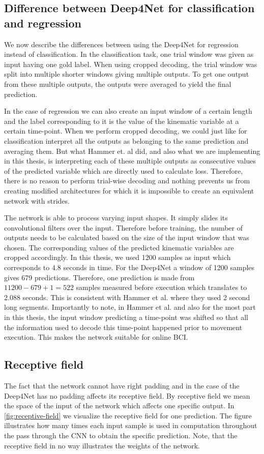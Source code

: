 \subsection{Difference between Deep4Net for classification and regression}\label{subsec:difference-between-deep4net-for-classification-and-regression}
We now describe the differences between using the Deep4Net for regression instead of classification.
In the classification task, one trial window was given as input having one gold label.
When using cropped decoding, the trial window was split into multiple shorter windows giving multiple outputs.
To get one output from these multiple outputs, the outputs were averaged to yield the final prediction.

In the case of regression we can also create an input window of a certain length and the label corresponding to it is the value of the kinematic variable at a certain time-point.
When we perform cropped decoding, we could just like for classification interpret all the outputs as belonging to the same prediction and averaging them.
But what Hammer et. al did, and also what we are implementing in this thesis, is interpreting each of these multiple outputs as consecutive values of the predicted variable which are directly used to calculate loss.
Therefore, there is no reason to perform trial-wise decoding and nothing prevents us from creating modified architectures for which it is impossible to create an equivalent network with strides.

The network is able to process varying input shapes.
It simply slides its convolutional filters over the input.
Therefore before training, the number of outputs needs to be calculated based on the size of the input window that was chosen.
The corresponding values of the predicted kinematic variables are cropped accordingly.
In this thesis, we used 1200 samples as input which corresponds to 4.8 seconds in time.
For the Deep4Net a window of 1200 samples gives 679 predictions.
Therefore, one prediction is made from $11200 - 679 + 1 = 522 $ samples measured before execution which translates to 2.088 seconds.
This is consistent with Hammer et al. where they used 2 second long segments.
Importantly to note, in Hammer et al. and also for the most part in this thesis, the input window predicting a time-point was shifted so that all the information used to decode this time-point happened prior to movement execution.
This makes the network suitable for online BCI\@.


\subsection{Receptive field}
The fact that the network cannot have right padding and in the case of the Deep4Net has no padding affects its receptive field.
By receptive field we mean the space of the input of the network which affects one specific output.
In \cref{fig:receptive-field} we visualize the receptive field for one prediction.
The figure illustrates how many times each input sample is used in computation throughout the pass through the CNN to obtain the specific prediction.
Note, that the receptive field in no way illustrates the weights of the network.

